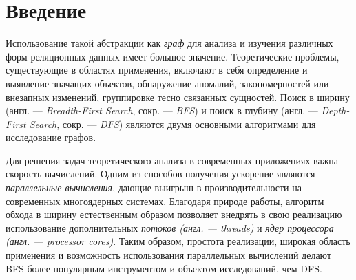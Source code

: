 
\section*{Введение}
\label{sec:intro}
Использование такой абстракции как \textit{граф} для анализа и изучения различных форм реляционных данных имеет большое значение. Теоретические проблемы, существующие в областях применения, включают в себя определение и выявление значащих объектов, обнаружение аномалий, закономерностей или внезапных изменений, группировке тесно связанных сущностей. Поиск в ширину (англ. --- \textit{Breadth-First Search}, сокр. --- \textit{BFS}) и поиск в глубину (англ. --- \textit{Depth-First Search}, сокр. --- \textit{DFS}) являются двумя основными алгоритмами для исследование графов. 

Для решения задач теоретического анализа в современных приложениях важна скорость вычислений. Одним из способов получения ускорение являются \textit{параллельные вычисления}, дающие выигрыш в производительности на современных многоядерных системах. Благодаря природе работы, алгоритм обхода в ширину естественным образом позволяет внедрять в свою реализацию использование дополнительных \textit{потоков (англ. --- threads)} и \textit{ядер процессора (англ. --- processor cores)}. Таким образом, простота реализации, широкая область применения и возможность использования параллельных вычислений делают BFS более популярным инструментом и объектом исследований, чем DFS.